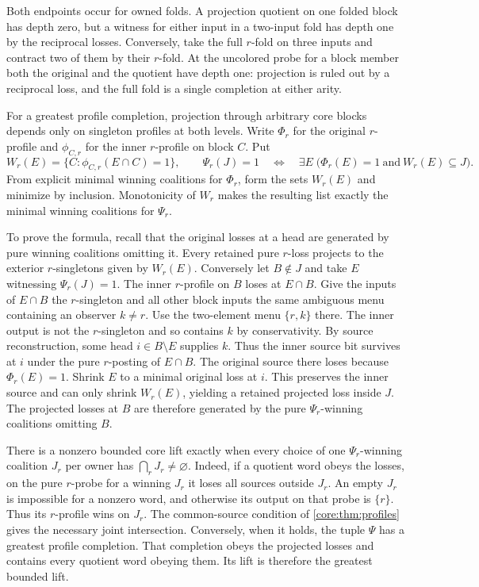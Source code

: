 Both endpoints occur for owned folds. A projection
quotient on one folded block has depth zero, but
a witness for either input in a two-input fold
has depth one by the reciprocal losses. Conversely,
take the full $r$-fold on three inputs and contract
two of them by their $r$-fold. At the uncolored
probe for a block member both the original and the
quotient have depth one: projection is ruled out
by a reciprocal loss, and the full fold is a
single completion at either arity.

For a greatest profile completion, projection through
arbitrary core blocks depends only on singleton profiles
at both levels. Write $\Phi_r$ for the original
$r$-profile and $\phi_{C,r}$ for the inner $r$-profile
on block $C$. Put
\[
 W_r(E)=\{C:\phi_{C,r}(E\cap C)=1\},
 \qquad
 \Psi_r(J)=1
 \quad\Longleftrightarrow\quad
 \exists E\; \bigl(\Phi_r(E)=1
       \ \text{and}\ W_r(E)\subseteq J\bigr).
\]
From explicit minimal winning coalitions for $\Phi_r$,
form the sets $W_r(E)$ and minimize by inclusion.
Monotonicity of $W_r$ makes the resulting list exactly
the minimal winning coalitions for $\Psi_r$.

To prove the formula, recall that the original losses
at a head are generated by pure winning coalitions
omitting it. Every retained pure $r$-loss projects to
the exterior $r$-singletons given by $W_r(E)$.
Conversely let $B\notin J$ and take $E$ witnessing
$\Psi_r(J)=1$. The inner $r$-profile on $B$ loses
at $E\cap B$. Give the inputs of $E\cap B$ the
$r$-singleton and all other block inputs the same
ambiguous menu containing an observer $k\ne r$.
Use the two-element menu $\{r,k\}$ there. The inner
output is not the $r$-singleton and so contains $k$
by conservativity. By source reconstruction, some head
$i\in B\setminus E$ supplies $k$. Thus the inner
source bit survives at $i$ under the pure $r$-posting
of $E\cap B$. The original source there loses
because $\Phi_r(E)=1$. Shrink $E$ to a minimal
original loss at $i$. This preserves the inner
source and can only shrink $W_r(E)$, yielding a
retained projected loss inside $J$. The projected
losses at $B$ are therefore generated by the pure
$\Psi_r$-winning coalitions omitting $B$.

There is a nonzero bounded core lift exactly when
every choice of one $\Psi_r$-winning coalition $J_r$
per owner has $\bigcap_r J_r\ne\varnothing$.
Indeed, if a quotient word obeys the losses, on the
pure $r$-probe for a winning $J_r$ it loses all sources
outside $J_r$. An empty $J_r$ is impossible for a
nonzero word, and otherwise its output on that probe
is $\{r\}$. Thus its $r$-profile wins on $J_r$.
The common-source condition of \cref{core:thm:profiles}
gives the necessary joint intersection. Conversely,
when it holds, the tuple $\Psi$ has a greatest profile
completion. That completion obeys the projected
losses and contains every quotient word obeying them.
Its lift is therefore the greatest bounded lift.

